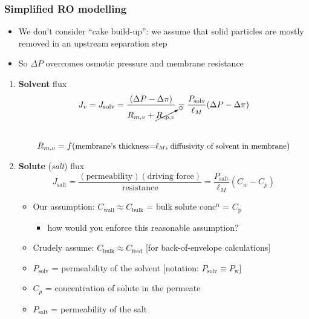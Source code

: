 \begin{frame}\frametitle{Simplified RO modelling}
	\begin{itemize}
		\item	We don't consider ``cake build-up'': we assume that solid particles are mostly removed in an upstream separation step
		\item	So $\Delta P$ overcomes osmotic pressure and membrane resistance
	\end{itemize}
	\vspace{-6pt}
	\begin{enumerate}
		\item	\textbf{Solvent} flux
			\[	J_v = J_\text{solv} = \frac{(\Delta P - \Delta \pi)}{R_{m,v} + \cancelto{0}{R_{cp,v}}} = \frac{P_\text{solv}}{\ell_M}(\Delta P - \Delta \pi) \] \\
			\[	R_{m,v} = f(\text{\small membrane's thickness=$\ell_M$, diffusivity of solvent in membrane})\]
		\item	\textbf{Solute} (\emph{salt}) flux
			\[
				J_\text{salt} = \dfrac{(\text{permeability})(\text{driving force})}{\text{resistance}} = \dfrac{P_\text{salt}}{\ell_M} \left(C_w - C_p\right)
			\]
			\begin{itemize}
				\item	Our assumption: $C_\text{wall} \approx C_\text{bulk}$ = bulk solute conc$^\text{n}$ = $C_\text{p}$
				\begin{itemize}
					\item	how would you enforce this reasonable assumption?  %
				\end{itemize}
				\item	Crudely assume: $C_\text{bulk}  \approx C_\text{feed}$ {\scriptsize [for back-of-envelope calculations]}
				\item	$P_\text{solv}$ = permeability of the solvent [notation: $P_\text{solv} \equiv P_\text{w}$]
				\item	$C_p$ = concentration of solute in the permeate
				\item	$P_\text{salt}$ = permeability of the salt
			\end{itemize}
	\end{enumerate}
\end{frame}

